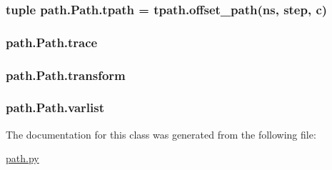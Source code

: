 \subsubsection[{tpath}]{\setlength{\rightskip}{0pt plus 5cm}tuple path.\+Path.\+tpath = tpath.\+offset\+\_\+path({\bf ns}, {\bf step}, c)\hspace{0.3cm}{\ttfamily [static]}}\label{classpath_1_1_path_a267b3e61d69b7d9283b8d751eda8eaab}
\hypertarget{classpath_1_1_path_a7c28949b03cd0ede340ca5329a845220}{}
\subsubsection[{trace}]{\setlength{\rightskip}{0pt plus 5cm}path.\+Path.\+trace}\label{classpath_1_1_path_a7c28949b03cd0ede340ca5329a845220}
\hypertarget{classpath_1_1_path_a18e1d6f703cbee9b5df9e326dc4dfe4d}{}
\subsubsection[{transform}]{\setlength{\rightskip}{0pt plus 5cm}path.\+Path.\+transform}\label{classpath_1_1_path_a18e1d6f703cbee9b5df9e326dc4dfe4d}
\hypertarget{classpath_1_1_path_a2e9e6fbbaa8a13ae3f6d634fda839383}{}
\subsubsection[{varlist}]{\setlength{\rightskip}{0pt plus 5cm}path.\+Path.\+varlist}\label{classpath_1_1_path_a2e9e6fbbaa8a13ae3f6d634fda839383}


The documentation for this class was generated from the following file\+:\begin{DoxyCompactItemize}
\item 
\hyperlink{path_8py}{path.\+py}\end{DoxyCompactItemize}
